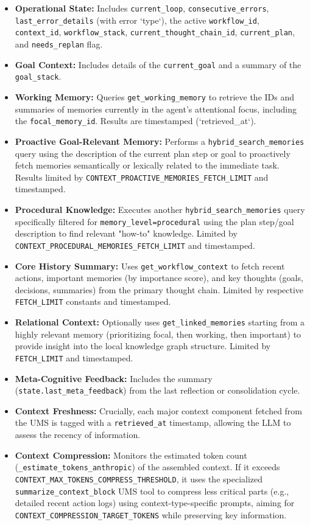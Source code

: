 \documentclass[12pt,a4paper]{article}
\newcommand{\code}[1]{\nolinkurl{#1}}
\begin{document}
\begin{itemize}
    \item \textbf{Operational State:} Includes \code{current\_loop}, \code{consecutive\_errors}, \code{last\_error\_details} (with error `type`), the active \code{workflow\_id}, \code{context\_id}, \code{workflow\_stack}, \code{current\_thought\_chain\_id}, \code{current\_plan}, and \code{needs\_replan} flag.
    \item \textbf{Goal Context:} Includes details of the \code{current\_goal} and a summary of the \code{goal\_stack}.
    \item \textbf{Working Memory:} Queries \code{get\_working\_memory} to retrieve the IDs and summaries of memories currently in the agent's attentional focus, including the \code{focal\_memory\_id}. Results are timestamped (`retrieved\_at`).
    \item \textbf{Proactive Goal-Relevant Memory:} Performs a \code{hybrid\_search\_memories} query using the description of the current plan step or goal to proactively fetch memories semantically or lexically related to the immediate task. Results limited by \code{CONTEXT\_PROACTIVE\_MEMORIES\_FETCH\_LIMIT} and timestamped.
    \item \textbf{Procedural Knowledge:} Executes another \code{hybrid\_search\_memories} query specifically filtered for \code{memory\_level=procedural} using the plan step/goal description to find relevant "how-to" knowledge. Limited by \code{CONTEXT\_PROCEDURAL\_MEMORIES\_FETCH\_LIMIT} and timestamped.
    \item \textbf{Core History Summary:} Uses \code{get\_workflow\_context} to fetch recent actions, important memories (by importance score), and key thoughts (goals, decisions, summaries) from the primary thought chain. Limited by respective \code{FETCH\_LIMIT} constants and timestamped.
    \item \textbf{Relational Context:} Optionally uses \code{get\_linked\_memories} starting from a highly relevant memory (prioritizing focal, then working, then important) to provide insight into the local knowledge graph structure. Limited by \code{FETCH\_LIMIT} and timestamped.
    \item \textbf{Meta-Cognitive Feedback:} Includes the summary (\code{state.last\_meta\_feedback}) from the last reflection or consolidation cycle.
    \item \textbf{Context Freshness:} Crucially, each major context component fetched from the UMS is tagged with a \code{retrieved\_at} timestamp, allowing the LLM to assess the recency of information.
    \item \textbf{Context Compression:} Monitors the estimated token count (\code{\_estimate\_tokens\_anthropic}) of the assembled context. If it exceeds \code{CONTEXT\_MAX\_TOKENS\_COMPRESS\_THRESHOLD}, it uses the specialized \code{summarize\_context\_block} UMS tool to compress less critical parts (e.g., detailed recent action logs) using context-type-specific prompts, aiming for \code{CONTEXT\_COMPRESSION\_TARGET\_TOKENS} while preserving key information.
\end{itemize}
\end{document}
